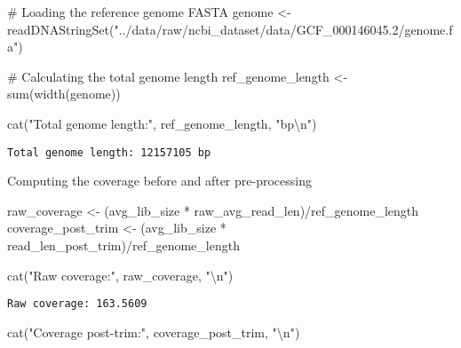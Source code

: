 \documentclass[
  letterpaper,
  DIV=11,
  numbers=noendperiod]{scrartcl}
\newenvironment{Shaded}{\begin{snugshade}}{\end{snugshade}}
\newcommand{\CommentTok}[1]{\textcolor[rgb]{0.37,0.37,0.37}{#1}}
\newcommand{\FunctionTok}[1]{\textcolor[rgb]{0.28,0.35,0.67}{#1}}
\newcommand{\NormalTok}[1]{\textcolor[rgb]{0.00,0.23,0.31}{#1}}
\newcommand{\OtherTok}[1]{\textcolor[rgb]{0.00,0.23,0.31}{#1}}
\newcommand{\SpecialCharTok}[1]{\textcolor[rgb]{0.37,0.37,0.37}{#1}}
\newcommand{\StringTok}[1]{\textcolor[rgb]{0.13,0.47,0.30}{#1}}
\begin{document}
\begin{Shaded}
\begin{Highlighting}[]
\CommentTok{\# Loading the reference genome FASTA}
\NormalTok{genome }\OtherTok{\textless{}{-}} \FunctionTok{readDNAStringSet}\NormalTok{(}\StringTok{"../data/raw/ncbi\_dataset/data/GCF\_000146045.2/genome.fa"}\NormalTok{)}

\CommentTok{\# Calculating the total genome length}
\NormalTok{ref\_genome\_length }\OtherTok{\textless{}{-}} \FunctionTok{sum}\NormalTok{(}\FunctionTok{width}\NormalTok{(genome))}

\FunctionTok{cat}\NormalTok{(}\StringTok{"Total genome length:"}\NormalTok{, ref\_genome\_length, }\StringTok{"bp}\SpecialCharTok{\textbackslash{}n}\StringTok{"}\NormalTok{)}
\end{Highlighting}
\end{Shaded}

\begin{verbatim}
Total genome length: 12157105 bp
\end{verbatim}

Computing the coverage before and after pre-processing

\begin{Shaded}
\begin{Highlighting}[]
\NormalTok{raw\_coverage }\OtherTok{\textless{}{-}}\NormalTok{ (avg\_lib\_size }\SpecialCharTok{*}\NormalTok{ raw\_avg\_read\_len)}\SpecialCharTok{/}\NormalTok{ref\_genome\_length}
\NormalTok{coverage\_post\_trim }\OtherTok{\textless{}{-}}\NormalTok{ (avg\_lib\_size }\SpecialCharTok{*}\NormalTok{ read\_len\_post\_trim)}\SpecialCharTok{/}\NormalTok{ref\_genome\_length}

\FunctionTok{cat}\NormalTok{(}\StringTok{"Raw coverage:"}\NormalTok{, raw\_coverage, }\StringTok{"}\SpecialCharTok{\textbackslash{}n}\StringTok{"}\NormalTok{)}
\end{Highlighting}
\end{Shaded}

\begin{verbatim}
Raw coverage: 163.5609 
\end{verbatim}

\begin{Shaded}
\begin{Highlighting}[]
\FunctionTok{cat}\NormalTok{(}\StringTok{"Coverage post{-}trim:"}\NormalTok{, coverage\_post\_trim, }\StringTok{"}\SpecialCharTok{\textbackslash{}n}\StringTok{"}\NormalTok{)}
\end{Highlighting}
\end{Shaded}
\end{document}
